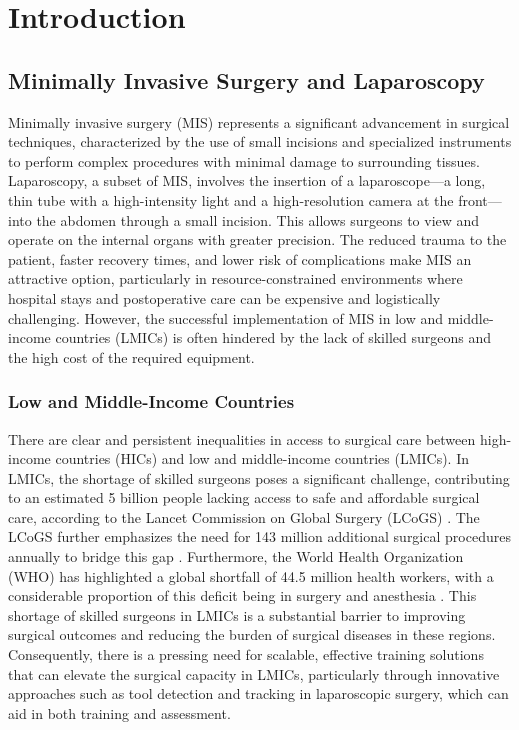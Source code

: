 \section{Introduction}

\subsection{Minimally Invasive Surgery and Laparoscopy}

Minimally invasive surgery (MIS) represents a significant advancement in surgical techniques, characterized by the use of small incisions and specialized instruments to perform complex procedures with minimal damage to surrounding tissues. Laparoscopy, a subset of MIS, involves the insertion of a laparoscope—a long, thin tube with a high-intensity light and a high-resolution camera at the front—into the abdomen through a small incision. This allows surgeons to view and operate on the internal organs with greater precision. The reduced trauma to the patient, faster recovery times, and lower risk of complications make MIS an attractive option, particularly in resource-constrained environments where hospital stays and postoperative care can be expensive and logistically challenging. However, the successful implementation of MIS in low and middle-income countries (LMICs) is often hindered by the lack of skilled surgeons and the high cost of the required equipment.


\subsubsection{Low and Middle-Income Countries}

There are clear and persistent inequalities in access to surgical care between high-income countries (HICs) and low and middle-income countries (LMICs). In LMICs, the shortage of skilled surgeons poses a significant challenge, contributing to an estimated 5 billion people lacking access to safe and affordable surgical care, according to the Lancet Commission on Global Surgery (LCoGS) \cite{mearaglobal2015}. The LCoGS further emphasizes the need for 143 million additional surgical procedures annually to bridge this gap \cite{mearaglobal2015}. Furthermore, the World Health Organization (WHO) has highlighted a global shortfall of 44.5 million health workers, with a considerable proportion of this deficit being in surgery and anesthesia \cite{worldhealthorganizationglobal2016}. This shortage of skilled surgeons in LMICs is a substantial barrier to improving surgical outcomes and reducing the burden of surgical diseases in these regions. Consequently, there is a pressing need for scalable, effective training solutions that can elevate the surgical capacity in LMICs, particularly through innovative approaches such as tool detection and tracking in laparoscopic surgery, which can aid in both training and assessment.

